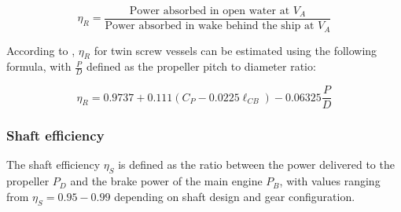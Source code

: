 \begin{equation}
    \label{eqn: n_rot_MAN}
    \eta_R = \frac{\text{Power absorbed in open water at }V_A}{\text{Power absorbed in wake behind the ship at }V_A}
\end{equation}

According to , $\eta_R$ for twin screw vessels can be estimated using the following formula, with $\frac{P}{D}$ defined as the propeller pitch to diameter ratio:

\begin{equation}
    \label{eqn: eta_rot_holtrop}
    \eta_R = 0.9737 + 0.111(C_P-0.0225\ell_{CB}) - 0.06325\frac{P}{D}
\end{equation}

\subsubsection*{Shaft efficiency}

The shaft efficiency $\eta_S$ is defined as the ratio between the power delivered to the propeller $P_D$ and the brake power of the main engine $P_B$, with values ranging from $\eta_S = 0.95 - 0.99$ depending on shaft design and gear configuration.





















    






